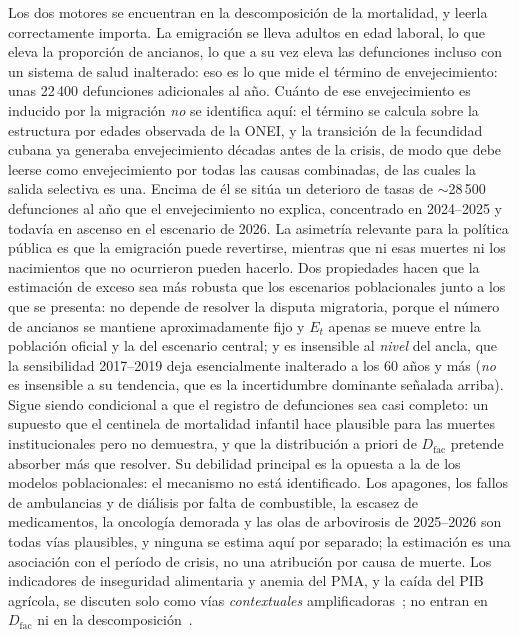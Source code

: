 \documentclass[11pt,a4paper]{article}
\begin{document}
Los dos motores se encuentran en la descomposición de la mortalidad, y leerla correctamente importa.
La emigración se lleva adultos en edad laboral, lo que eleva la proporción de ancianos, lo que a su vez eleva las defunciones incluso con un sistema de salud inalterado: eso es lo que mide el término de envejecimiento: unas 22\,400 defunciones adicionales al año.
Cuánto de ese envejecimiento es inducido por la migración \emph{no} se identifica aquí: el término se calcula sobre la estructura por edades observada de la ONEI, y la transición de la fecundidad cubana ya generaba envejecimiento décadas antes de la crisis, de modo que debe leerse como envejecimiento por todas las causas combinadas, de las cuales la salida selectiva es una.
Encima de él se sitúa un deterioro de tasas de $\sim$28\,500 defunciones al año que el envejecimiento no explica, concentrado en 2024--2025 y todavía en ascenso en el escenario de 2026.
La asimetría relevante para la política pública es que la emigración puede revertirse, mientras que ni esas muertes ni los nacimientos que no ocurrieron pueden hacerlo.
Dos propiedades hacen que la estimación de exceso sea más robusta que los escenarios poblacionales junto a los que se presenta: no depende de resolver la disputa migratoria, porque el número de ancianos se mantiene aproximadamente fijo y $E_t$ apenas se mueve entre la población oficial y la del escenario central; y es insensible al \emph{nivel} del ancla, que la sensibilidad 2017--2019 deja esencialmente inalterado a los 60 años y más (\emph{no} es insensible a su tendencia, que es la incertidumbre dominante señalada arriba).
Sigue siendo condicional a que el registro de defunciones sea casi completo: un supuesto que el centinela de mortalidad infantil hace plausible para las muertes institucionales pero no demuestra, y que la distribución a priori de $D_{\mathrm{fac}}$ pretende absorber más que resolver.
Su debilidad principal es la opuesta a la de los modelos poblacionales: el mecanismo no está identificado.
Los apagones, los fallos de ambulancias y de diálisis por falta de combustible, la escasez de medicamentos, la oncología demorada y las olas de arbovirosis de 2025--2026 son todas vías plausibles, y ninguna se estima aquí por separado; la estimación es una asociación con el período de crisis, no una atribución por causa de muerte.
Los indicadores de inseguridad alimentaria y anemia del PMA, y la caída del PIB agrícola, se discuten solo como vías \emph{contextuales} amplificadoras~\citep{wfp_cuba}; no entran en $D_{\mathrm{fac}}$ ni en la descomposición~\citep{karlinsky2021,msemburi2023}.
\end{document}
